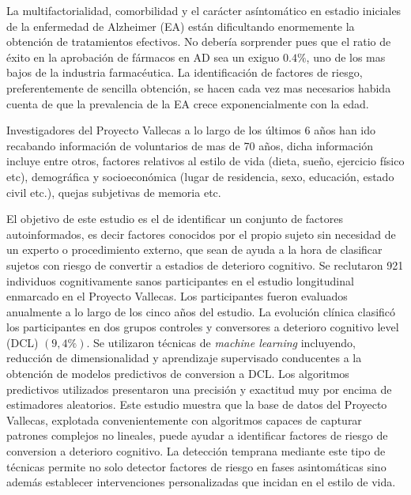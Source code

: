 \documentclass[11pt]{article}
\theoremstyle{definition}
\theoremstyle{remark}
\begin{document}
La multifactorialidad, comorbilidad y el carácter asíntomático en estadio iniciales de la enfermedad de Alzheimer (EA) están dificultando enormemente la obtención de tratamientos efectivos. No debería sorprender pues que el ratio de éxito en la aprobación de fármacos en AD sea un exiguo $0.4\%$, uno de los mas bajos de la industria farmacéutica. 
La identificación de factores de riesgo, preferentemente de sencilla obtención, se hacen cada vez mas necesarios habida cuenta de que la prevalencia de la EA crece exponencialmente con la edad. 

Investigadores del Proyecto Vallecas a lo largo de los últimos 6 años han ido recabando información de voluntarios de mas de 70 años, dicha información incluye entre otros, factores relativos al estilo de vida (dieta, sueño, ejercicio físico etc), demográfica y socioeconómica (lugar de residencia, sexo, educación, estado civil etc.), quejas subjetivas de memoria etc.

El objetivo de este estudio es el de identificar un conjunto de factores autoinformados, es decir factores conocidos por el propio sujeto sin necesidad de un experto o procedimiento externo, que sean de ayuda a la hora de clasificar sujetos con riesgo de convertir a estadios de deterioro cognitivo. 
Se reclutaron 921 individuos cognitivamente sanos participantes en el estudio longitudinal enmarcado en el Proyecto Vallecas. Los participantes fueron evaluados anualmente a lo largo de los cinco años del estudio. La evolución clínica clasificó los participantes en dos grupos controles y conversores a deterioro cognitivo level (DCL) $(9,4\%)$. 
Se utilizaron técnicas de \emph{machine learning} incluyendo, reducción de dimensionalidad y aprendizaje supervisado conducentes a la obtención de modelos predictivos de conversion a DCL. Los algoritmos predictivos utilizados presentaron una precisión y exactitud muy por encima de estimadores aleatorios.
Este estudio muestra que la base de datos del Proyecto Vallecas, explotada convenientemente con algoritmos capaces de capturar patrones complejos no lineales, puede ayudar a identificar factores de riesgo de conversion a deterioro cognitivo. La detección temprana mediante este tipo de técnicas permite no solo detector factores de riesgo en fases asintomáticas sino además establecer intervenciones personalizadas que incidan en el estilo de vida.
\end{document}
